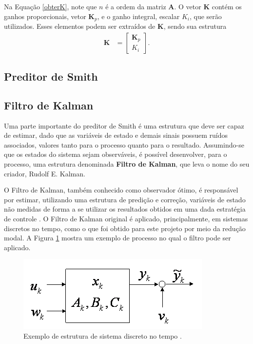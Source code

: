 Na Equação \ref{obterK}, note que $n$ é a ordem da matriz $\mathbf{A}$. O vetor $\mathbf{K}$ contém os ganhos proporcionais, vetor $\mathbf{K}_p$, e o ganho integral, escalar $K_i$, que serão utilizados. Esses elementos podem ser extraídos de $\mathbf{K}$, sendo sua estrutura \begin{align}
	\mathbf{K} & = \left[\begin{array}{c}\mathbf{K}_p\\ K_i\end{array}\right].
\end{align}

\subsection{Preditor de Smith}

\subsection{Filtro de Kalman}
Uma parte importante do preditor de Smith é uma estrutura que deve ser capaz de estimar, dado que as variáveis de estado e demais sinais possuem ruídos associados, valores tanto para o processo quanto para o resultado. Assumindo-se que os estados do sistema sejam observáveis, é possível desenvolver, para o processo, uma estrutura denominada \textbf{Filtro de Kalman}, que leva o nome do seu criador, Rudolf E. Kalman.

O Filtro de Kalman, também conhecido como observador ótimo, é responsável por estimar, utilizando uma estrutura de predição e correção, variáveis de estado não medidas de forma a se utilizar os resultados obtidos em uma dada estratégia de controle \cite{GoddardKalman}. O Filtro de Kalman original é aplicado, principalmente, em sistemas discretos no tempo, como o que foi obtido para este projeto por meio da redução modal. A Figura \ref{Kalman1} mostra um exemplo de processo no qual o filtro pode ser aplicado.
\begin{figure}[!ht]
\centering
\caption{Exemplo de estrutura de sistema discreto no tempo \cite{GoddardKalman}. \label{Kalman1}}
\includegraphics[width=.7\linewidth]{figs/kalman/kalman1}
\end{figure}

